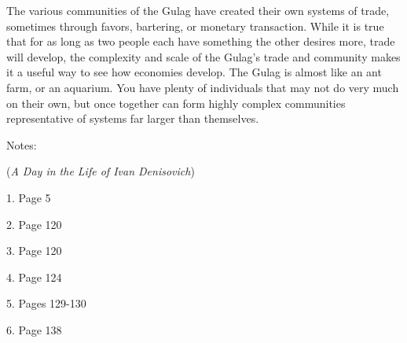 \documentclass[12pt]{article}
\begin{document}
\begin{flushleft}
The various communities of the Gulag have created their own systems of trade, sometimes through favors, bartering, or monetary transaction. 
While it is true that for as long as two people each have something the other desires more, trade will develop, the complexity and scale of the Gulag's trade and community makes it a useful way to see how economies develop.
The Gulag is almost like an ant farm, or an aquarium. You have plenty of individuals that may not do very much on their own, but once together can form highly complex communities representative of systems far larger than themselves.



\begin{center}
Notes:

(\emph{A Day in the Life of Ivan Denisovich})

\end{center}


\setlength{\parindent}{0.5in}


1. Page 5     

2. Page 120

3. Page 120

4. Page 124

5. Pages 129-130 

6. Page 138

\end{flushleft}
\end{document}
